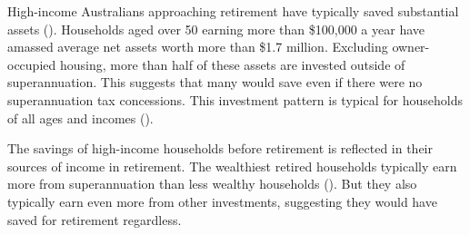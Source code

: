 High-income Australians approaching retirement have typically saved substantial assets (). Households aged over 50 earning more than \$100,000 a year have amassed average net assets worth more than \$1.7 million. Excluding owner-occupied housing, more than half of these assets are invested outside of superannuation. This suggests that many would save even if there were no superannuation tax concessions. This investment pattern is typical for households of all ages and incomes ().

The savings of high-income households before retirement is reflected in their sources of income in retirement. The wealthiest retired households typically earn more from superannuation than less wealthy households (). But they also typically earn even more from other investments, suggesting they would have saved for retirement regardless.



